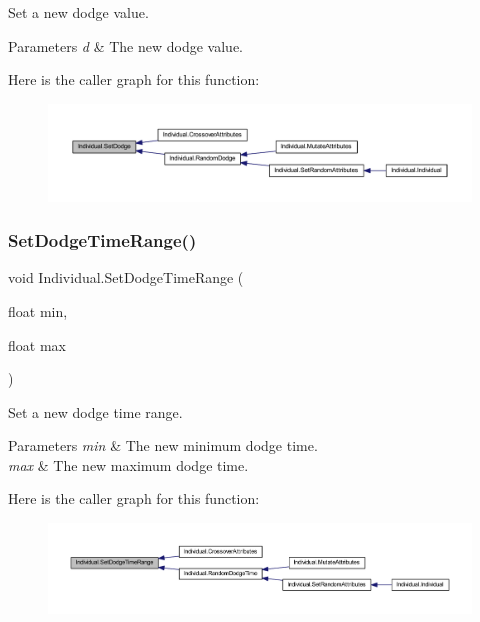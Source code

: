 Set a new dodge value. 


\begin{DoxyParams}{Parameters}
{\em d} & The new dodge value.\\
\hline
\end{DoxyParams}
Here is the caller graph for this function\+:\nopagebreak
\begin{figure}[H]
\begin{center}
\leavevmode
\includegraphics[width=350pt]{class_individual_a31b0b7114a58803aba9e81b6650fd7cb_icgraph}
\end{center}
\end{figure}
\mbox{\label{class_individual_aeff5fb1f9a1619c4fb2e880b6f62b311}} 
\subsubsection{\texorpdfstring{Set\+Dodge\+Time\+Range()}{SetDodgeTimeRange()}}
{\footnotesize\ttfamily void Individual.\+Set\+Dodge\+Time\+Range (\begin{DoxyParamCaption}\item[{float}]{min,  }\item[{float}]{max }\end{DoxyParamCaption})}



Set a new dodge time range. 


\begin{DoxyParams}{Parameters}
{\em min} & The new minimum dodge time.\\
\hline
{\em max} & The new maximum dodge time.\\
\hline
\end{DoxyParams}
Here is the caller graph for this function\+:\nopagebreak
\begin{figure}[H]
\begin{center}
\leavevmode
\includegraphics[width=350pt]{class_individual_aeff5fb1f9a1619c4fb2e880b6f62b311_icgraph}
\end{center}
\end{figure}
\mbox{\label{class_individual_a31ca5e7277bc5f8cbe48bde294590095}} 
